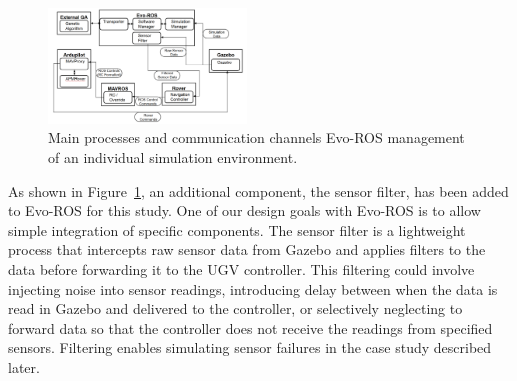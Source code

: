 \vspace{-0.1in}
\begin{figure}[ht]
	\centering
    \includegraphics[width=0.47\textwidth]{Figures/evo_ros_diagram.PNG}
    \vspace{-0.05in}
    \caption{Main processes and communication channels 
Evo-ROS management of an individual simulation environment.}
    \label{evo_ros_diagram}
    \vspace{-0.1in}
\end{figure}



%

As shown in Figure~\ref{evo_ros_diagram},
an additional component, the sensor filter, has
been added to Evo-ROS for this study.
%
One of our design goals with Evo-ROS is to allow simple integration of specific components.  The sensor filter is
%
a lightweight process that intercepts raw sensor data from Gazebo
and applies filters to the data before forwarding it to the UGV controller. 
%
This filtering could involve injecting noise into sensor readings, introducing delay between when the data is read in Gazebo and delivered to the controller, or selectively neglecting to forward data so that the controller does not receive the readings from specified sensors. Filtering  enables simulating sensor failures in the case study described later.

